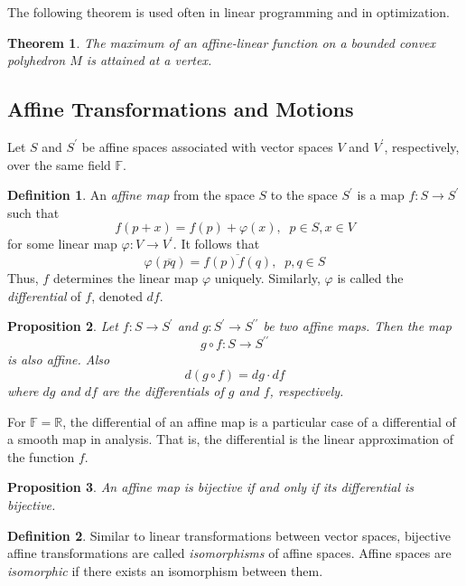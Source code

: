 \documentclass{article}
\newtheorem{theorem}{Theorem}[section]
\newtheorem{proposition}[theorem]{Proposition}
\theoremstyle{remark}
\theoremstyle{definition}
\newtheorem{definition}{Definition}[section]
\begin{document}
The following theorem is used often in linear programming and in optimization. 

\begin{theorem}
The maximum of an affine-linear function on a bounded convex polyhedron $M$ is attained at a vertex. 
\end{theorem}

\subsection{Affine Transformations and Motions}
Let $S$ and $S^\prime$ be affine spaces associated with vector spaces $V$ and $V^\prime$, respectively, over the same field $\mathbb{F}$. 

\begin{definition}
An \textit{affine map} from the space $S$ to the space $S^\prime$ is a map $f: S \longrightarrow S^\prime$ such that
\[f(p+x) = f(p) + \varphi(x), \;\; p \in S, x \in V\]
for some linear map $\varphi: V \longrightarrow V^\prime$. It follows that
\[\varphi(\overline{pq}) = \overline{f(p) f(q)}, \;\; p, q \in S\]
Thus, $f$ determines the linear map $\varphi$ uniquely. Similarly, $\varphi$ is called the \textit{differential} of $f$, denoted $df$. 
\end{definition}

\begin{proposition}
Let $f: S \longrightarrow S^\prime$ and $g: S^\prime \longrightarrow S^{\prime \prime}$ be two affine maps. Then the map
\[g \circ f : S \longrightarrow S^{\prime\prime}\]
is also affine. Also
\[d(g \circ f) = dg \cdot df\]
where $dg$ and $df$ are the differentials of $g$ and $f$, respectively. 
\end{proposition}

For $\mathbb{F} = \mathbb{R}$, the differential of an affine map is a particular case of a differential of a smooth map in analysis. That is, the differential is the linear approximation of the function $f$. 

\begin{proposition}
An affine map is bijective if and only if its differential is bijective. 
\end{proposition}

\begin{definition}
Similar to linear transformations between vector spaces, bijective affine transformations are called \textit{isomorphisms} of affine spaces. Affine spaces are \textit{isomorphic} if there exists an isomorphism between them. 
\end{definition}
\end{document}

